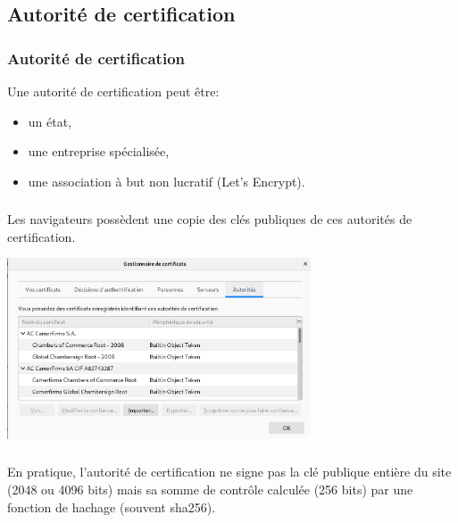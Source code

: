 \documentclass[svgnames,11pt]{beamer}
\begin{document}
\subsection{Autorité de certification}
\begin{frame}
    \frametitle{Autorité de certification}

    Une autorité de certification peut être:
\begin{itemize}
    \item un état,
    \item une entreprise spécialisée,
    \item une association à but non lucratif (Let's Encrypt).
\end{itemize}

\end{frame}
\begin{frame}
    \frametitle{}

    Les navigateurs possèdent une copie des clés publiques de ces autorités de certification.

\begin{center}
\centering
\includegraphics[width=9cm]{ressources/certificats.png}
\label{IMG}
\end{center}


\end{frame}
\begin{frame}
    \frametitle{}

    \begin{aretenir}
        En pratique, l'autorité de certification ne signe pas la clé publique entière du site (2048 ou 4096 bits) mais sa somme de contrôle calculée (256 bits) par une fonction de hachage (souvent sha256).
    \end{aretenir}

\end{frame}
\end{document}

